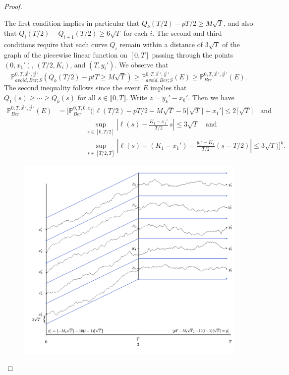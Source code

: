 \begin{proof}
\begin{enumerate}[label=(\arabic*)]
	\end{enumerate}
	The first condition implies in particular that $Q_k(T/2)-pT/2 \geq M\sqrt{T}$, and also that $Q_i(T/2)-Q_{i+1}(T/2)\geq 6\sqrt{T}$ for each $i$. The second and third conditions require that each curve $Q_i$ remain within a distance of $3\sqrt{T}$ of the graph of the piecewise linear function on $[0,T]$ passing through the points $(0,x_1')$, $(T/2,K_i)$, and $(T,y_i')$. We observe that
	\[
	\mathbb{P}^{0,T,\vec{x}\,',\vec{y}\,'}_{avoid, Ber; S} \left(Q_k(T/2) - ptT \geq M\sqrt{T}\right) \geq \mathbb{P}^{0,T,\vec{x}\,',\vec{y}\,'}_{avoid, Ber; S}(E) \geq \mathbb{P}^{0,T,\vec{x}\,',\vec{y}\,'}_{Ber}(E).
	\]
	The second inequality follows since the event $E$ implies that $Q_1(s)\geq\cdots\geq Q_k(s)$ for all $s\in\llbracket 0,T \rrbracket$. Write $z=y_k'-x_k'$. Then we have
	\begin{equation}\label{19gibbs}
	\begin{split}
	\mathbb{P}^{0,T,\vec{x}\,',\vec{y}\,'}_{Ber}(E) &= \bigg[\mathbb{P}^{0,T,0,z}_{Ber}\bigg(\left|\ell(T/2)-pT/2-M\sqrt{T}-5\lceil\sqrt{T}\rceil+x_1'\right|\leq 2\lceil\sqrt{T}\rceil \quad\mathrm{and}\\
	&\qquad\qquad \sup_{s\in[0,T/2]}\left|\ell(s) - \frac{K_1-x_1'}{T/2}\,s\right| \leq 3\sqrt{T}\quad\mathrm{and}\\
	&\qquad\qquad \sup_{s\in[T/2,T]}\left|\ell(s)-(K_1-x_1')-\frac{y_1'-K_1}{T/2}(s-T/2)\right| \leq 3\sqrt{T}\bigg) \bigg]^k.
	\end{split}
	\end{equation}
\begin{figure}
	\includegraphics[scale=0.6]{graphics/Lemma320.jpg}

\end{figure}
\end{proof}
